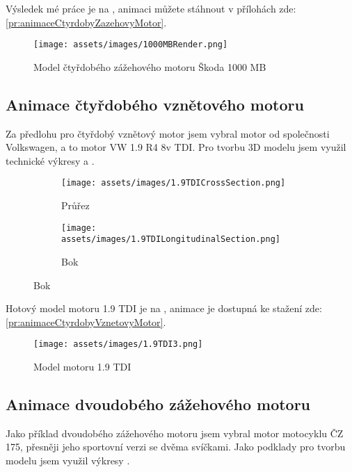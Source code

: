 {Výsledek mé práce je na , animaci můžete stáhnout v přílohách zde: \ref{pr:animaceCtyrdobyZazehovyMotor}.}

\begin{figure}[H]
    \centering
    \texttt{[image: assets/images/1000MBRender.png]}
    \caption{Model čtyřdobého zážehového motoru Škoda 1000 MB \jaObr}
    \label{obr:1000MBRender}
\end{figure}
\newpage

\subsection{Animace čtyřdobého vznětového motoru}
{Za předlohu pro čtyřdobý vznětový motor jsem vybral motor od společnosti Volkswagen, a to motor VW 1.9 R4 8v TDI. Pro tvorbu 3D modelu jsem využil technické výkresy  a .}
\cite{VWGAG:RealizingFutureTrendsInDieselEngineDevelopment}

\begin{figure}[H]
    \centering
    \begin{subfigure}{.5\textwidth}
        \centering
        \texttt{[image: assets/images/1.9TDICrossSection.png]}
        \caption{Průřez}
        \label{obr:1.9TDIvykresyPrurez}
    \end{subfigure}%
    \begin{subfigure}{.5\textwidth}
        \centering
        \texttt{[image: assets/images/1.9TDILongitudinalSection.png]}
        \caption{Bok}
        \label{obr:1.9TDIvykresyBok}
    \end{subfigure}
\end{figure}

{Hotový model motoru 1.9 TDI je na , animace je dostupná ke stažení zde: \ref{pr:animaceCtyrdobyVznetovyMotor}.}

\begin{figure}[H]
    \centering
    \texttt{[image: assets/images/1.9TDI3.png]}
    \caption{Model motoru 1.9 TDI \jaObr}
    \label{obr:1.9TDImodel}
\end{figure}

\newpage

\subsection{Animace dvoudobého zážehového motoru}
{Jako příklad dvoudobého zážehového motoru jsem vybral motor motocyklu ČZ 175, přesněji jeho sportovní verzi se dvěma svíčkami. Jako podklady pro tvorbu modelu jsem využil výkresy .}
\cite{MZ:CZ175}

